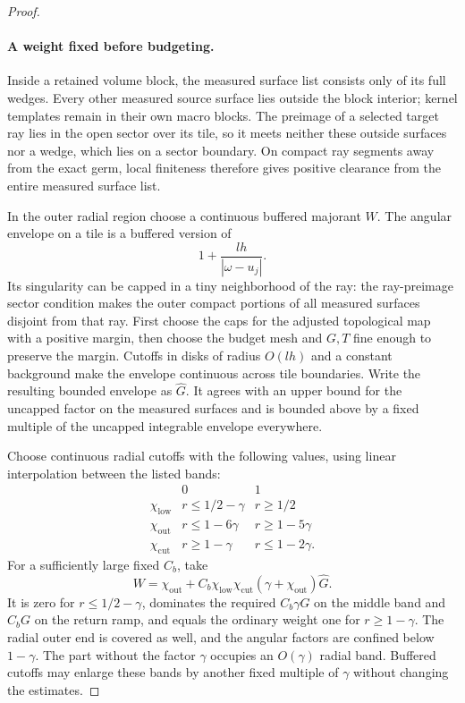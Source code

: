 \documentclass[11pt]{article}
\numberwithin{equation}{section}
\theoremstyle{definition}
\theoremstyle{remark}
\begin{document}
\begin{proof}
\paragraph{A weight fixed before budgeting.}
Inside a retained volume block, the measured surface list consists
only of its full wedges.  Every other measured source surface lies
outside the block interior; kernel templates remain in their own
macro blocks.  The preimage of a selected target ray lies in the
open sector over its tile, so it meets neither these outside
surfaces nor a wedge, which lies on a sector boundary.  On compact
ray segments away from the exact germ, local finiteness therefore
gives positive clearance from the entire measured surface list.

In the outer radial region choose a continuous buffered majorant
$W$.  The angular envelope on a tile is a buffered version of
\[
 1+\frac{lh}{|\omega-u_j|}.
\]
Its singularity can be capped in a tiny neighborhood of the ray:
the ray-preimage sector condition makes the outer compact portions
of all measured surfaces disjoint from that ray.  First choose the
caps for the adjusted topological map with a positive margin, then
choose the budget mesh and $G,T$ fine enough to preserve the margin.
Cutoffs in disks of radius $O(lh)$ and a constant background make
the envelope continuous across tile boundaries.  Write the resulting
bounded envelope as $\widehat G$.  It agrees with an upper bound for
the uncapped factor on the measured surfaces and is bounded above
by a fixed multiple of the uncapped integrable envelope everywhere.

Choose continuous radial cutoffs with the following values, using
linear interpolation between the listed bands:
\[
\begin{array}{c|cc}
 &0&1\\ \hline
 \chi_{\mathrm{low}}&r\le1/2-\gamma&r\ge1/2\\
 \chi_{\mathrm{out}}&r\le1-6\gamma&r\ge1-5\gamma\\
 \chi_{\mathrm{cut}}&r\ge1-\gamma&r\le1-2\gamma.
\end{array}
\]
For a sufficiently large fixed $C_b$, take
\begin{equation}\label{la:outer-weight}
 W=\chi_{\mathrm{out}}+
   C_b\chi_{\mathrm{low}}\chi_{\mathrm{cut}}
             (\gamma+\chi_{\mathrm{out}})\widehat G.
\end{equation}
It is zero for $r\le1/2-\gamma$, dominates the required
$C_b\gamma G$ on the middle band and $C_bG$ on the return ramp,
and equals the ordinary weight one for $r\ge1-\gamma$.
The radial outer end is covered as well, and the angular factors
are confined below $1-\gamma$.  The part without the factor $\gamma$ occupies an
$O(\gamma)$ radial band.  Buffered cutoffs may enlarge these bands
by another fixed multiple of $\gamma$ without changing the estimates.


\end{proof}
\end{document}
